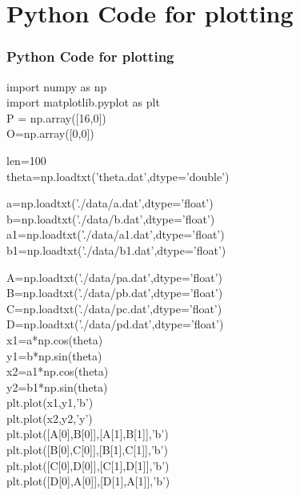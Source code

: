 \documentclass{beamer}
\theoremstyle{remark}
\numberwithin{equation}{section}
\begin{document}
\section{Python Code for plotting}
\begin{frame}
\frametitle{Python Code for plotting}
\vspace{10pt}
import numpy as np\\
import matplotlib.pyplot as plt\\
\vspace{14pt}
P = np.array([16,0])\\

O=np.array([0,0])\\

\vspace{20pt}

len=100\\
theta=np.loadtxt('theta.dat',dtype='double')\\
\vspace{10pt}

a=np.loadtxt('./data/a.dat',dtype='float')\\
b=np.loadtxt('./data/b.dat',dtype='float')\\
\vspace{20pt}
a1=np.loadtxt('./data/a1.dat',dtype='float')\\
b1=np.loadtxt('./data/b1.dat',dtype='float')\\
\vspace{20pt}
\end{frame}
\begin{frame}
\vspace{20pt}
A=np.loadtxt('./data/pa.dat',dtype='float')\\
B=np.loadtxt('./data/pb.dat',dtype='float')\\
C=np.loadtxt('./data/pc.dat',dtype='float')\\
D=np.loadtxt('./data/pd.dat',dtype='float')\\
\vspace{20pt}
x1=a*np.cos(theta)\\
y1=b*np.sin(theta)\\
x2=a1*np.cos(theta)\\
y2=b1*np.sin(theta)\\
\vspace{10pt}
plt.plot(x1,y1,'b')\\
plt.plot(x2,y2,'y')\\
\vspace{10pt}
plt.plot([A[0],B[0]],[A[1],B[1]],'b')\\
plt.plot([B[0],C[0]],[B[1],C[1]],'b')\\
plt.plot([C[0],D[0]],[C[1],D[1]],'b')\\
plt.plot([D[0],A[0]],[D[1],A[1]],'b')\\
\vspace{10pt}
\end{frame}
\end{document}

